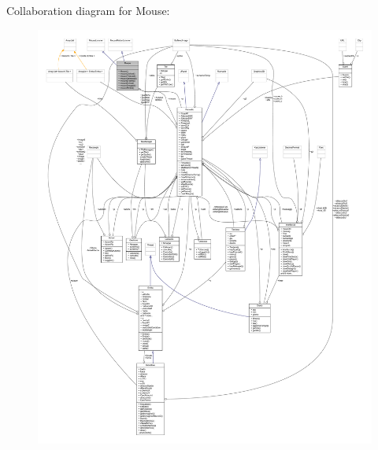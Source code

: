 Collaboration diagram for Mouse\+:
\nopagebreak
\begin{figure}[H]
\begin{center}
\leavevmode
\includegraphics[width=350pt]{classa_1_1survival_1_1game_1_1_mouse__coll__graph}
\end{center}
\end{figure}
